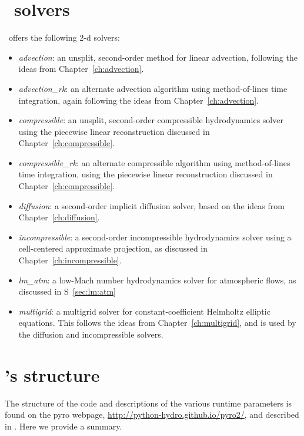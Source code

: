\section{\pyro\ solvers}

\pyro\ offers the following 2-d solvers:
\begin{itemize}
\item {\em advection}: an unsplit, second-order method for linear advection,
  following the ideas from Chapter~\ref{ch:advection}.

\item {\em advection\_rk}: an alternate advection algorithm using
  method-of-lines time integration, again following the ideas
  from Chapter~\ref{ch:advection}.

\item {\em compressible}: an unsplit, second-order compressible
  hydrodynamics solver using the piecewise linear reconstruction
  discussed in Chapter~\ref{ch:compressible}.

\item {\em compressible\_rk}: an alternate compressible algorithm
  using method-of-lines time integration, using the piecewise
  linear reconstruction discussed in Chapter~\ref{ch:compressible}.

\item {\em diffusion}: a second-order implicit diffusion solver, based
  on the ideas from Chapter~\ref{ch:diffusion}.

\item {\em incompressible}: a second-order incompressible hydrodynamics
  solver using a cell-centered approximate projection, as discussed
  in Chapter~\ref{ch:incompressible}.

\item {\em lm\_atm}: a low-Mach number hydrodynamics solver for
  atmospheric flows, as discussed in S~\ref{sec:lm:atm}
  
\item {\em multigrid}: a multigrid solver for constant-coefficient Helmholtz
  elliptic equations.  This follows the ideas from Chapter~\ref{ch:multigrid},
  and is used by the diffusion and incompressible solvers.

\end{itemize}

\section{\pyro 's structure}

The structure of the code and descriptions of the various runtime
parameters is found on the pyro webpage,
\url{http://python-hydro.github.io/pyro2/}, and described
in \cite{pyro}.  Here we provide a summary.

